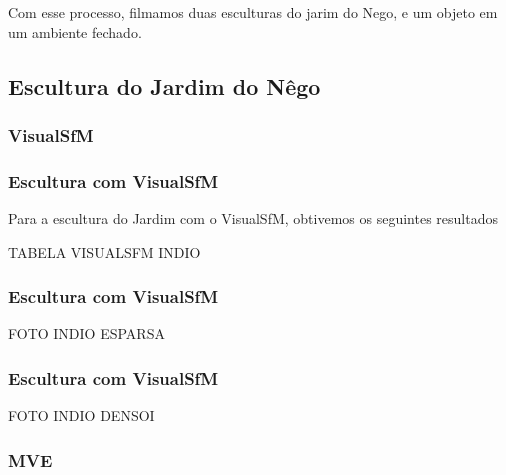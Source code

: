 \documentclass[table, usenames, svgnames, xcolor=dvipsnames]{beamer}
\begin{document}
\begin{frame}
	\begin{center}
		Com esse processo, filmamos duas esculturas do jarim do Nego, e um objeto em um ambiente fechado. 
	\end{center}
\end{frame}

\subsection{Escultura do Jardim do Nêgo}


\subsubsection{VisualSfM}

\begin{frame}
	\begin{center}
	\end{center}
\end{frame}

\begin{frame}
\frametitle{\textbf{Escultura com VisualSfM}}
	Para a escultura do Jardim com o VisualSfM, obtivemos os seguintes resultados
	
	TABELA VISUALSFM INDIO
\end{frame}

\begin{frame}
\frametitle{\textbf{Escultura com VisualSfM}}
	FOTO INDIO ESPARSA
\end{frame}

\begin{frame}
\frametitle{\textbf{Escultura com VisualSfM}}
FOTO INDIO DENSOI
\end{frame}

\subsubsection{MVE}
\begin{frame}
	\begin{center}
	\end{center}
\end{frame}
\end{document}
